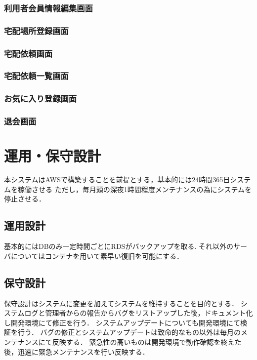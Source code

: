 \documentclass[a4paper, titlepage]{jsarticle}
\begin{document}
\subsubsection{利用者会員情報編集画面}
\subsubsection{宅配場所登録画面}
\subsubsection{宅配依頼画面}
\subsubsection{宅配依頼一覧画面}
\subsubsection{お気に入り登録画面}
\subsubsection{退会画面}

\section{運用・保守設計}
本システムはAWSで構築することを前提とする，基本的には24時間365日システムを稼働させる
ただし，毎月頭の深夜1時間程度メンテナンスの為にシステムを停止させる．
\subsection{運用設計}
基本的にはDBのみ一定時間ごとにRDSがバックアップを取る.
それ以外のサーバについてはコンテナを用いて素早い復旧を可能にする．

\subsection{保守設計}
保守設計はシステムに変更を加えてシステムを維持することを目的とする．
システムログと管理者からの報告からバグをリストアップした後，ドキュメント化し開発環境にて修正を行う．
システムアップデートについても開発環境にて検証を行う．
バグの修正とシステムアップデートは致命的なもの以外は毎月のメンテナンスにて反映する．
緊急性の高いものは開発環境で動作確認を終えた後，迅速に緊急メンテナンスを行い反映する．
\end{document}
